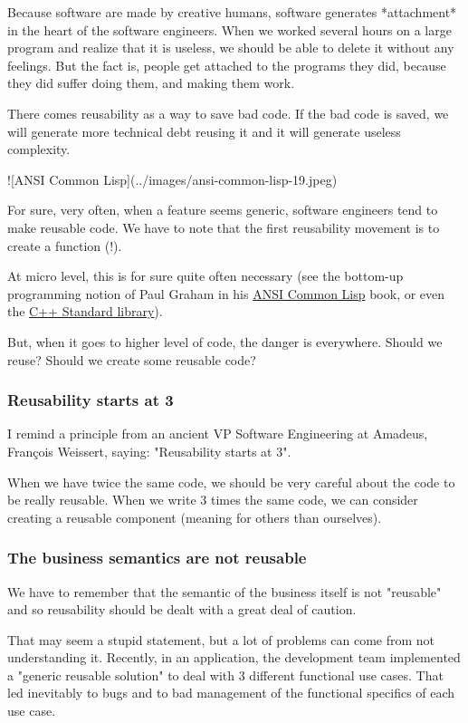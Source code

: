\documentclass[]{article}
\begin{document}
Because software are made by creative humans, software generates *attachment* in the heart of the software engineers. When we worked several hours on a large program and realize that it is useless, we should be able to delete it without any feelings. But the fact is, people get attached to the programs they did, because they did suffer doing them, and making them work.

There comes reusability as a way to save bad code. If the bad code is saved, we will generate more technical debt reusing it and it will generate useless complexity.

![ANSI Common Lisp](../images/ansi-common-lisp-19.jpeg)

For sure, very often, when a feature seems generic, software engineers tend to make reusable code. We have to note that the first reusability movement is to create a function (!).

At micro level, this is for sure quite often necessary (see the bottom-up programming notion of Paul Graham in his \href{https://paulgraham.com/acl.html}{ANSI Common Lisp} book, or even the \href{https://en.wikipedia.org/wiki/C%2B%2B_Standard_Library}{C++ Standard library}).

But, when it goes to higher level of code, the danger is everywhere. Should we reuse? Should we create some reusable code?

\subsubsection{Reusability starts at 3}

I remind a principle from an ancient VP Software Engineering at Amadeus, François Weissert, saying: "Reusability starts at 3".

When we have twice the same code, we should be very careful about the code to be really reusable. When we write 3 times the same code, we can consider creating a reusable component (meaning for others than ourselves).

\subsubsection{The business semantics are not reusable}

We have to remember that the semantic of the business itself is not "reusable" and so reusability should be dealt with a great deal of caution.

That may seem a stupid statement, but a lot of problems can come from not understanding it. Recently, in an application, the development team implemented a "generic reusable solution" to deal with 3 different functional use cases. That led inevitably to bugs and to bad management of the functional specifics of each use case.
\end{document}
